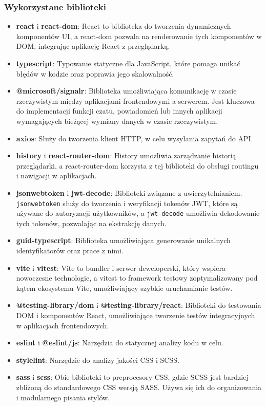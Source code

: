 \documentclass[twoside]{projektInzynierskiMS1}
\begin{document}
\newpage

\subsubsection{Wykorzystane biblioteki}

\begin{itemize} 
    \item \textbf{react} i \textbf{react-dom}: React to biblioteka do tworzenia dynamicznych komponentów UI, a react-dom pozwala na renderowanie tych komponentów w DOM, integrując aplikację React z przeglądarką. 
    \item \textbf{typescript}: Typowanie statyczne dla JavaScript, które pomaga unikać błędów w kodzie oraz poprawia jego skalowalność.
    \item \textbf{@microsoft/signalr}: Biblioteka umożliwiająca komunikację w czasie rzeczywistym między aplikacjami frontendowymi a serwerem. Jest kluczowa do implementacji funkcji czatu, powiadomień lub innych aplikacji wymagających bieżącej wymiany danych w czasie rzeczywistym.
    \item \textbf{axios}: Służy do tworzenia klient HTTP, w celu wysyłania zapytań do API. 
    \item \textbf{history} i \textbf{react-router-dom}: History umożliwia zarządzanie historią przeglądarki, a react-router-dom korzysta z tej biblioteki do obsługi routingu i nawigacji w aplikacjach. 
    \item \textbf{jsonwebtoken} i \textbf{jwt-decode}: Biblioteki związane z uwierzytelnianiem. \texttt{jsonwebtoken} służy do tworzenia i weryfikacji tokenów JWT, które są używane do autoryzacji użytkowników, a \texttt{jwt-decode} umożliwia dekodowanie tych tokenów, pozwalając na ekstrakcję danych.
    \item \textbf{guid-typescript}: Biblioteka umożliwiająca generowanie unikalnych identyfikatorów oraz prace z nimi.
    \item \textbf{vite} i \textbf{vitest}: Vite to bundler i serwer deweloperski, który wspiera nowoczesne technologie, a vitest to framework testowy zoptymalizowany pod kątem ekosystemu Vite, umożliwiający szybkie uruchamianie testów. 
    \item \textbf{@testing-library/dom} i \textbf{@testing-library/react}: Biblioteki do testowania DOM i komponentów React, umożliwiające tworzenie testów integracyjnych w aplikacjach frontendowych. 
    \item \textbf{eslint} i \textbf{@eslint/js}: Narzędzia do statycznej analizy kodu w celu.
    \item \textbf{stylelint}: Narzędzie do analizy jakości CSS i SCSS. 
    \item \textbf{sass} i \textbf{scss}: Obie biblioteki to preprocesory CSS, gdzie SCSS jest bardziej zbliżoną do standardowego CSS wersją SASS. Używa się ich do organizowania i modularnego pisania stylów. 
\end{itemize}
\end{document}
